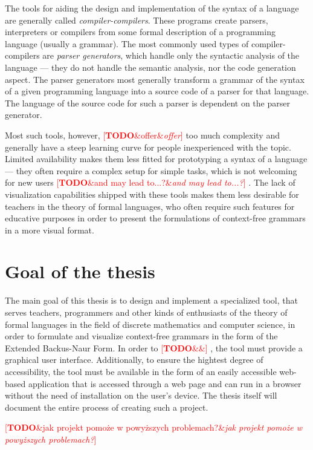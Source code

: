 \documentclass[english,engineering]{wizthesis}
\newcommand{\todo}[1]{%
  \textcolor{red}{[\textbf{TODO}\ifx&#1&{}\else{ }\fi\emph{#1}]}%
}
\begin{document}
The tools for aiding the design and implementation of the syntax of a language
are generally called \emph{compiler-compilers}. These programs create parsers,
interpreters or compilers from some formal description of a programming
language (usually a grammar). The most commonly used types of
compiler-compilers are \emph{parser generators}, which handle only the
syntactic analysis of the language --- they do not handle the semantic analysis,
nor the code generation aspect. The parser generators most generally transform a
grammar of the syntax of a given programming language into a source code of a
parser for that language. The language of the source code for such a parser is
dependent on the parser generator.

Most such tools, however, \todo{offer} too much complexity and generally have a steep
learning curve for people inexperienced with the topic. Limited availability
makes them less fitted for prototyping a syntax of a language --- they often
require a complex setup for simple tasks, which is not welcoming for new users
\todo{and may lead to...?}. The lack of visualization capabilities shipped with
these tools makes them less desirable for teachers in the theory of formal
languages, who often require such features for educative purposes in order to
present the formulations of context-free grammars in a more visual format.

\section{Goal of the thesis}

The main goal of this thesis is to design and implement a specialized tool, that
serves teachers, programmers and other kinds of enthusiasts of the theory of
formal languages in the field of discrete mathematics and computer science, in
order to formulate and visualize context-free grammars in the form of the
Extended Backus-Naur Form. In order to \todo{}, the tool must provide a
graphical user interface. Additionally, to ensure the hightest degree of
accessibility, the tool must be available in the form of an easily accessible
web-based application that is accessed through a web page and can run in a
browser without the need of installation on the user's device. The thesis itself
will document the entire process of creating such a project.

\todo{jak projekt pomoże w powyższych problemach?}
\end{document}
